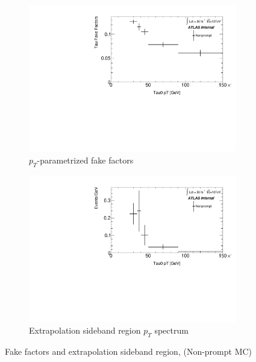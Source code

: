 \documentclass[11pt]{article}
\begin{document}
	\begin{figure}[H]
	\centering
	\begin{subfigure}{.5\textwidth}
	\centering
	\includegraphics[width=0.95\linewidth]{figures/FakesEstimate_data_pp8_nonallhad_new_scaledHists/FF_Faketau_Nonprompt.pdf}
  	\caption{$p_T$-parametrized fake factors}
  	\label{fig:sub1}
	\end{subfigure}%
	\begin{subfigure}{.5\textwidth}
	\centering
	\includegraphics[width=0.95\linewidth]{figures/FakesEstimate_data_pp8_nonallhad_new_scaledHists/hist_Extrapolation_Nonprompt.pdf}
	\caption{Extrapolation sideband region $p_T$ spectrum}
	\end{subfigure}
	\caption{Fake factors and extrapolation sideband region, (Non-prompt MC)}
	\end{figure}
\end{document}
